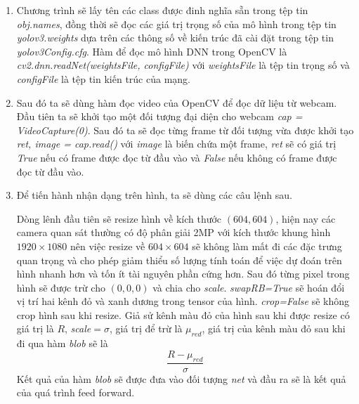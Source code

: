 \begin{enumerate}
	\item Chương trình sẽ lấy tên các class được đinh nghĩa sẵn trong tệp tin \emph{obj.names}, đồng thời sẽ đọc các giá trị trọng số của mô hình trong tệp tin \emph{yolov3.weights} dựa trên các thông số về kiến trúc đã cài đặt trong tệp tin \emph{yolov3Config.cfg}. Hàm để đọc mô hình DNN trong OpenCV là \emph{cv2.dnn.readNet(weightsFile, configFile)} với \emph{weightsFile} là tệp tin trọng số và \emph{configFile} là tệp tin kiến trúc của mạng.
	
	\item Sau đó ta sẽ dùng hàm đọc video của OpenCV để đọc dữ liệu từ webcam. Đầu tiên ta sẽ khởi tạo một đối tượng đại diện cho webcam \emph{cap = VideoCapture(0)}. Sau đó ta sẽ đọc từng frame từ đối tượng vừa được khởi tạo \emph{ret, image = cap.read()} với \emph{image} là biến chứa một frame, \emph{ret} sẽ có giá trị \emph{True} nếu có frame được đọc từ đầu vào và \emph{False} nếu không có frame được đọc từ đầu vào.
	
	\item Để tiến hành nhận dạng trên hình, ta sẽ dùng các câu lệnh sau.

\noindent{}

	Dòng lênh đầu tiên sẽ resize hình về kích thước $(604, 604)$, hiện nay các camera quan sát thường có độ phân giải 2MP với kích thước khung hình $1920 \times 1080$ nên việc resize về $604 \times 604$ sẽ không làm mất đi các đặc trưng quan trọng và cho phép giảm thiểu số lượng tính toán để việc dự đoán trên hình nhanh hơn và tốn ít tài nguyên phần cứng hơn. Sau đó từng pixel trong hình sẽ được trừ cho $(0, 0, 0)$ và chia cho \emph{scale}. \emph{swapRB=True} sẽ hoán đổi vị trí hai kênh đỏ và xanh dương trong tensor của hình. \emph{crop=False} sẽ không crop hình sau khi resize. Giả sử kênh màu đỏ của hình sau khi được resize có giá trị là $R$, \emph{scale}$=\sigma$, giá trị để trừ là ${\mu}_{red}$, giá trị của kênh màu đỏ sau khi đi qua hàm \emph{blob} sẽ là
\begin{equation}
	\frac{R-{\mu}_{red}}{\sigma}
\end{equation} 
	Kết quả của hàm \emph{blob} sẽ được đưa vào đối tượng \emph{net} và đầu ra sẽ là kết quả của quá trình feed forward.
	

\end{enumerate}
